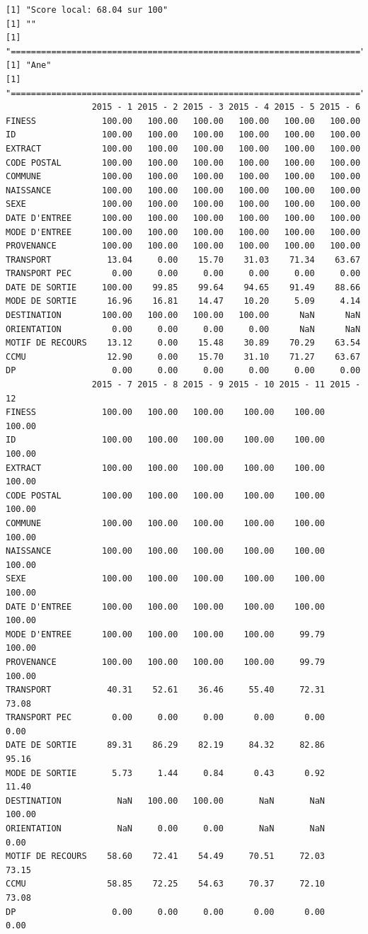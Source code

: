 \documentclass[]{article}
\begin{document}
\begin{verbatim}
[1] "Score local: 68.04 sur 100"
[1] ""
[1] "====================================================================="
[1] "Ane"
[1] "====================================================================="
                 2015 - 1 2015 - 2 2015 - 3 2015 - 4 2015 - 5 2015 - 6
FINESS             100.00   100.00   100.00   100.00   100.00   100.00
ID                 100.00   100.00   100.00   100.00   100.00   100.00
EXTRACT            100.00   100.00   100.00   100.00   100.00   100.00
CODE POSTAL        100.00   100.00   100.00   100.00   100.00   100.00
COMMUNE            100.00   100.00   100.00   100.00   100.00   100.00
NAISSANCE          100.00   100.00   100.00   100.00   100.00   100.00
SEXE               100.00   100.00   100.00   100.00   100.00   100.00
DATE D'ENTREE      100.00   100.00   100.00   100.00   100.00   100.00
MODE D'ENTREE      100.00   100.00   100.00   100.00   100.00   100.00
PROVENANCE         100.00   100.00   100.00   100.00   100.00   100.00
TRANSPORT           13.04     0.00    15.70    31.03    71.34    63.67
TRANSPORT PEC        0.00     0.00     0.00     0.00     0.00     0.00
DATE DE SORTIE     100.00    99.85    99.64    94.65    91.49    88.66
MODE DE SORTIE      16.96    16.81    14.47    10.20     5.09     4.14
DESTINATION        100.00   100.00   100.00   100.00      NaN      NaN
ORIENTATION          0.00     0.00     0.00     0.00      NaN      NaN
MOTIF DE RECOURS    13.12     0.00    15.48    30.89    70.29    63.54
CCMU                12.90     0.00    15.70    31.10    71.27    63.67
DP                   0.00     0.00     0.00     0.00     0.00     0.00
                 2015 - 7 2015 - 8 2015 - 9 2015 - 10 2015 - 11 2015 - 12
FINESS             100.00   100.00   100.00    100.00    100.00    100.00
ID                 100.00   100.00   100.00    100.00    100.00    100.00
EXTRACT            100.00   100.00   100.00    100.00    100.00    100.00
CODE POSTAL        100.00   100.00   100.00    100.00    100.00    100.00
COMMUNE            100.00   100.00   100.00    100.00    100.00    100.00
NAISSANCE          100.00   100.00   100.00    100.00    100.00    100.00
SEXE               100.00   100.00   100.00    100.00    100.00    100.00
DATE D'ENTREE      100.00   100.00   100.00    100.00    100.00    100.00
MODE D'ENTREE      100.00   100.00   100.00    100.00     99.79    100.00
PROVENANCE         100.00   100.00   100.00    100.00     99.79    100.00
TRANSPORT           40.31    52.61    36.46     55.40     72.31     73.08
TRANSPORT PEC        0.00     0.00     0.00      0.00      0.00      0.00
DATE DE SORTIE      89.31    86.29    82.19     84.32     82.86     95.16
MODE DE SORTIE       5.73     1.44     0.84      0.43      0.92     11.40
DESTINATION           NaN   100.00   100.00       NaN       NaN    100.00
ORIENTATION           NaN     0.00     0.00       NaN       NaN      0.00
MOTIF DE RECOURS    58.60    72.41    54.49     70.51     72.03     73.15
CCMU                58.85    72.25    54.63     70.37     72.10     73.08
DP                   0.00     0.00     0.00      0.00      0.00      0.00
\end{verbatim}
\end{document}
